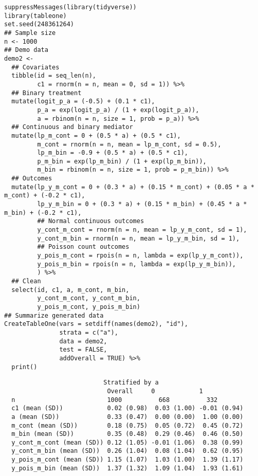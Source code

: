 \documentclass[10pt]{article}
\begin{document}
\scriptsize
\begin{verbatim}
suppressMessages(library(tidyverse))
library(tableone)
set.seed(248361264)
## Sample size
n <- 1000
## Demo data
demo2 <-
  ## Covariates
  tibble(id = seq_len(n),
         c1 = rnorm(n = n, mean = 0, sd = 1)) %>%
  ## Binary treatment
  mutate(logit_p_a = (-0.5) + (0.1 * c1),
         p_a = exp(logit_p_a) / (1 + exp(logit_p_a)),
         a = rbinom(n = n, size = 1, prob = p_a)) %>%
  ## Continuous and binary mediator
  mutate(lp_m_cont = 0 + (0.5 * a) + (0.5 * c1),
         m_cont = rnorm(n = n, mean = lp_m_cont, sd = 0.5),
         lp_m_bin = -0.9 + (0.5 * a) + (0.5 * c1),
         p_m_bin = exp(lp_m_bin) / (1 + exp(lp_m_bin)),
         m_bin = rbinom(n = n, size = 1, prob = p_m_bin)) %>%
  ## Outcomes
  mutate(lp_y_m_cont = 0 + (0.3 * a) + (0.15 * m_cont) + (0.05 * a * m_cont) + (-0.2 * c1),
         lp_y_m_bin = 0 + (0.3 * a) + (0.15 * m_bin) + (0.45 * a * m_bin) + (-0.2 * c1),
         ## Normal continuous outcomes
         y_cont_m_cont = rnorm(n = n, mean = lp_y_m_cont, sd = 1),
         y_cont_m_bin = rnorm(n = n, mean = lp_y_m_bin, sd = 1),
         ## Poisson count outcomes
         y_pois_m_cont = rpois(n = n, lambda = exp(lp_y_m_cont)),
         y_pois_m_bin = rpois(n = n, lambda = exp(lp_y_m_bin)),
         ) %>%
  ## Clean
  select(id, c1, a, m_cont, m_bin,
         y_cont_m_cont, y_cont_m_bin,
         y_pois_m_cont, y_pois_m_bin)
## Summarize generated data
CreateTableOne(vars = setdiff(names(demo2), "id"),
               strata = c("a"),
               data = demo2,
               test = FALSE,
               addOverall = TRUE) %>%
  print()
\end{verbatim}

\begin{verbatim}
                           Stratified by a
                            Overall     0            1           
  n                         1000          668          332       
  c1 (mean (SD))            0.02 (0.98)  0.03 (1.00) -0.01 (0.94)
  a (mean (SD))             0.33 (0.47)  0.00 (0.00)  1.00 (0.00)
  m_cont (mean (SD))        0.18 (0.75)  0.05 (0.72)  0.45 (0.72)
  m_bin (mean (SD))         0.35 (0.48)  0.29 (0.46)  0.46 (0.50)
  y_cont_m_cont (mean (SD)) 0.12 (1.05) -0.01 (1.06)  0.38 (0.99)
  y_cont_m_bin (mean (SD))  0.26 (1.04)  0.08 (1.04)  0.62 (0.95)
  y_pois_m_cont (mean (SD)) 1.15 (1.07)  1.03 (1.00)  1.39 (1.17)
  y_pois_m_bin (mean (SD))  1.37 (1.32)  1.09 (1.04)  1.93 (1.61)
\end{verbatim}
\end{document}
